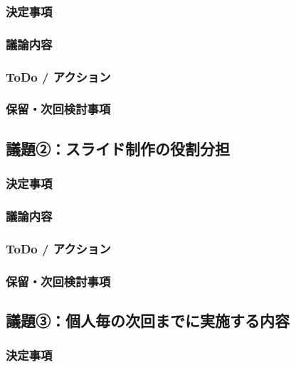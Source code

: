 \documentclass[a4paper,12pt]{ltjsarticle}
\begin{document}
\subsubsection*{決定事項}

\subsubsection*{議論内容}

\subsubsection*{ToDo / アクション}

\subsubsection*{保留・次回検討事項}

\subsection*{議題②：スライド制作の役割分担}

\subsubsection*{決定事項}

\subsubsection*{議論内容}

\subsubsection*{ToDo / アクション}

\subsubsection*{保留・次回検討事項}

\subsection*{議題③：個人毎の次回までに実施する内容}

\subsubsection*{決定事項}
\end{document}
